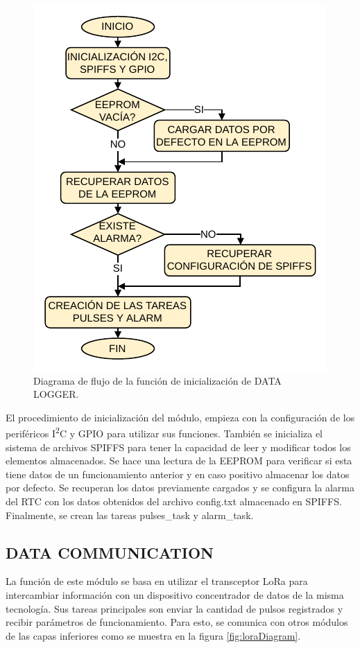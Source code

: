 \begin{figure}[h]
	\centering
	\includegraphics[scale=1]{./Figures/data_logger_init.pdf}
	\caption{Diagrama de flujo de la función de inicialización de DATA LOGGER.}
		\label{fig:flowDataInit}
\end{figure}

El procedimiento de inicialización del módulo, empieza con la configuración de los periféricos I\textsuperscript{2}C y GPIO para utilizar sus funciones. También se inicializa el sistema de archivos SPIFFS para tener la capacidad de leer y modificar todos los elementos almacenados. Se hace una lectura de la EEPROM para verificar si esta tiene datos de un funcionamiento anterior y en caso positivo almacenar los datos por defecto. Se recuperan los datos previamente cargados y se configura la alarma del RTC con los datos obtenidos del archivo config.txt almacenado en SPIFFS. Finalmente, se crean las tareas pulses\_task y alarm\_task.

\subsection{DATA COMMUNICATION}	

La función de este módulo se basa en utilizar el transceptor LoRa para intercambiar información con un dispositivo concentrador de datos de la misma tecnología. Sus tareas principales son enviar la cantidad de pulsos registrados y recibir parámetros de funcionamiento. Para esto, se comunica con otros módulos de las capas inferiores como se muestra en la figura \ref{fig:loraDiagram}.

